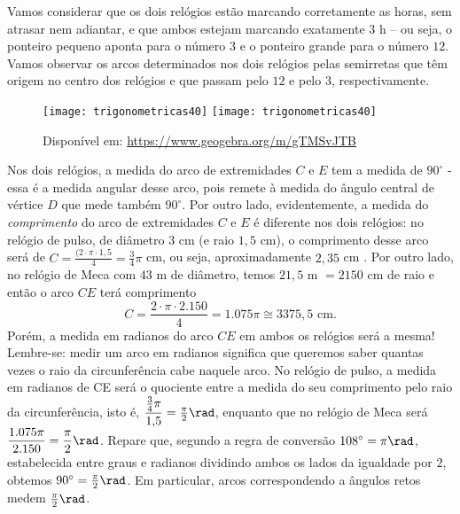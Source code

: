 Vamos considerar que os dois relógios estão marcando corretamente as horas, sem atrasar nem adiantar, e que ambos estejam marcando exatamente $3$ h – ou seja, o ponteiro pequeno aponta para o número $3$ e o ponteiro grande para o número $12$. Vamos observar os arcos determinados nos dois relógios pelas semirretas que têm origem no centro dos relógios e que passam pelo $12$ e pelo $3$, respectivamente.

\begin{figure}[H]
\centering

\texttt{[image: trigonometricas40]}
\hspace{2em}
\texttt{[image: trigonometricas40]}
\caption{Disponível em: \url{https://www.geogebra.org/m/gTMSvJTB}}
\label{}
\end{figure}

Nos dois relógios, a medida do arco de extremidades $C$ e $E$ tem a medida de $90^{\circ}$ - essa é a medida angular desse arco, pois remete à medida do ângulo central de vértice $D$ que mede também $90^{\circ}$. Por outro lado, evidentemente, a medida do \textit{comprimento} do arco de extremidades $C$ e $E$ é diferente nos dois relógios: no relógio de pulso, de diâmetro $3$ cm (e raio $1{,}5$ cm), o comprimento desse arco será de $C=\frac{(2\cdot\pi\cdot1{,}5}{4}=\frac{3}{4}\pi$ cm, ou seja, aproximadamente $2{,}35$ cm . Por outro lado, no relógio de Meca com $43$ m de diâmetro, temos $21{,}5\text{ m } = 2150$ cm de raio e então o arco $CE$ terá comprimento  
\begin{equation*}
C=\dfrac{2\cdot\pi\cdot2.150}{4}=1.075\pi\cong3375{,}5\text{ cm}.
\end{equation*}
Porém, a medida em radianos do arco $CE$ em ambos os relógios será a mesma! Lembre-se: medir um arco em radianos significa que queremos saber quantas vezes o raio da circunferência cabe naquele arco. No relógio de pulso, a medida em radianos de CE será o quociente entre a medida do seu comprimento pelo raio da circunferência, isto é, $\dfrac{\frac{3}{4}\pi}{1{,}5}=\frac{\pi}{2}\rad$, enquanto que no relógio de Meca será $\dfrac{1.075\pi}{2.150}=\dfrac{\pi}{2}\rad$. Repare que, segundo a regra de conversão $108^{\circ}=\pi\rad$, estabelecida entre graus e radianos dividindo ambos os lados da igualdade por $2$, obtemos $90^{\circ}=\frac{\pi}{2}\rad$. Em particular, arcos correspondendo a ângulos retos medem $\frac{\pi}{2}\rad$.

\clearpage
{}
\label{trig-prac2}


